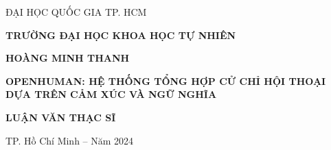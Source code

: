 \begin{titlepage}

\begin{mdframed}[linewidth=1pt, %
	linecolor=black, %
	leftmargin=0, %
	rightmargin=0, %
	innertopmargin=20mm, %
	innerbottommargin=20mm, %
	innerleftmargin=25mm, %
	innerrightmargin=25mm, %
	skipabove=0, %
	skipbelow=0] %
	
	\centering
	\vspace*{1cm}
	
	{\large	ĐẠI HỌC QUỐC GIA TP. HCM\par}
	\vspace{0.25cm}
	{\large \textbf{TRƯỜNG ĐẠI HỌC KHOA HỌC TỰ NHIÊN}\par}
	
	\vspace{2cm}
	
	{\large \MakeUppercase{\textbf{HOÀNG MINH THANH}}\par}
	
	\vspace{2cm}
	
	{\Large \bfseries
		\MakeUppercase{OpenHuman: Hệ thống tổng hợp cử chỉ hội thoại dựa trên cảm xúc và ngữ nghĩa} \par}
	
	\vspace{3cm}
	
	{\large \bfseries
		LUẬN VĂN THẠC SĨ\par}
		
	\vfill
	\vspace{3cm}
	
	{\small TP. Hồ Chí Minh – Năm 2024 \par}
\end{mdframed}
\end{titlepage}

